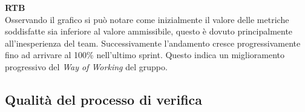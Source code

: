 \begin{flushleft}
\textbf{RTB} \\
Osservando il grafico si può notare come inizialmente il valore delle metriche soddisfatte sia inferiore al valore ammissibile, questo è dovuto principalmente all'inesperienza del team. Successivamente l'andamento cresce progressivamente fino ad arrivare al 100\% nell'ultimo sprint. Questo indica un miglioramento progressivo del \textit{Way of Working} del gruppo. \\
\end{flushleft}

\newpage
\subsection{Qualità del processo di verifica}
